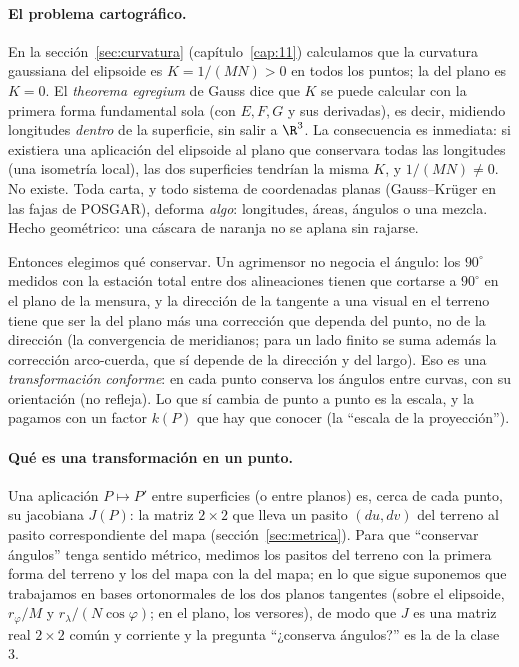 \paragraph{El problema cartográfico.} En la sección~\ref{sec:curvatura} (capítulo~\ref{cap:11}) calculamos que la
curvatura gaussiana del elipsoide es \(K=1/(MN)>0\) en todos los puntos; la del plano es
\(K=0\). El \emph{theorema egregium} de Gauss dice que \(K\) se puede calcular con la
primera forma fundamental sola (con \(E,F,G\) y sus derivadas), es decir, midiendo
longitudes \emph{dentro} de la superficie, sin salir a \(\R^3\). La consecuencia es
inmediata: si existiera una aplicación del elipsoide al plano que conservara todas las
longitudes (una isometría local), las dos superficies tendrían la misma \(K\), y
\(1/(MN)\neq0\). No existe. Toda carta, y todo sistema de coordenadas planas
(Gauss--Krüger en las fajas de POSGAR), deforma \emph{algo}: longitudes, áreas, ángulos o
una mezcla. Hecho geométrico: una cáscara de naranja no se aplana sin rajarse.

Entonces elegimos qué conservar. Un agrimensor no negocia el ángulo: los \(90^\circ\)
medidos con la estación total entre dos alineaciones tienen que cortarse a \(90^\circ\) en
el plano de la mensura, y la dirección de la tangente a una visual en el terreno tiene
que ser la del plano más una corrección que dependa del punto, no de la dirección (la
convergencia de meridianos; para un lado finito se suma además la corrección
arco-cuerda, que sí depende de la dirección y del largo). Eso es una
\emph{transformación conforme}: en cada punto conserva los ángulos entre curvas, con su
orientación (no refleja). Lo que sí cambia de punto a punto es la escala, y la pagamos con
un factor \(k(P)\) que hay que conocer (la ``escala de la proyección'').

\paragraph{Qué es una transformación en un punto.} Una aplicación \(P\mapsto P'\) entre
superficies (o entre planos) es, cerca de cada punto, su jacobiana \(J(P)\): la matriz
\(2\times2\) que lleva un pasito \((du,dv)\) del terreno al pasito correspondiente del mapa
(sección~\ref{sec:metrica}). Para que ``conservar ángulos'' tenga sentido métrico, medimos
los pasitos del terreno con la primera forma del terreno y los del mapa con la del mapa; en
lo que sigue suponemos que trabajamos en bases ortonormales de los dos planos tangentes
(sobre el elipsoide, \(r_\varphi/M\) y \(r_\lambda/(N\cos\varphi)\); en el plano, los
versores), de modo que \(J\) es una matriz real \(2\times2\) común y corriente y la
pregunta ``¿conserva ángulos?'' es la de la clase 3.

